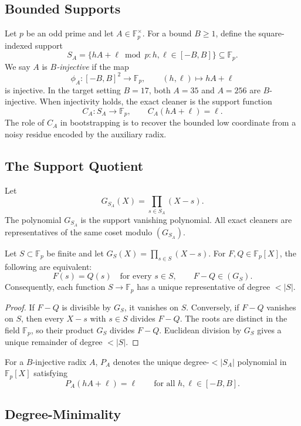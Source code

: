 \documentclass[a4paper,runningheads]{llncs}
\newcommand{\Fp}{\mathbb{F}_p}
\begin{document}
\subsection{Bounded Supports}

Let $p$ be an odd prime and let $A\in\Fp^\times$.  For a bound $B\ge 1$,
define the square-indexed support
\[
  S_A=\{hA+\ell \bmod p: h,\ell\in[-B,B]\}\subseteq\Fp .
\]
We say $A$ is \emph{$B$-injective} if the map
\[
  \phi_A:[-B,B]^2\to\Fp,\qquad (h,\ell)\mapsto hA+\ell
\]
is injective.  In the target setting $B=17$, both $A=35$ and $A=256$ are
$B$-injective.  When injectivity holds, the exact cleaner is the support
function
\[
  C_A:S_A\to\Fp,\qquad C_A(hA+\ell)=\ell.
\]
The role of $C_A$ in bootstrapping is to recover the bounded low coordinate
from a noisy residue encoded by the auxiliary radix.

\subsection{The Support Quotient}

Let
\[
  G_{S_A}(X)=\prod_{s\in S_A}(X-s).
\]
The polynomial $G_{S_A}$ is the support vanishing polynomial.  All exact
cleaners are representatives of the same coset modulo $(G_{S_A})$.

\begin{lemma}
\label{lem:support_quotient}
Let $S\subset\Fp$ be finite and let $G_S(X)=\prod_{s\in S}(X-s)$.  For
$F,Q\in\Fp[X]$, the following are equivalent:
\[
  F(s)=Q(s)\quad\text{for every }s\in S,
  \qquad
  F-Q\in(G_S).
\]
Consequently, each function $S\to\Fp$ has a unique representative of degree
$<|S|$.
\end{lemma}

\begin{proof}
If $F-Q$ is divisible by $G_S$, it vanishes on $S$.  Conversely, if $F-Q$
vanishes on $S$, then every $X-s$ with $s\in S$ divides $F-Q$.  The roots are
distinct in the field $\Fp$, so their product $G_S$ divides $F-Q$.  Euclidean
division by $G_S$ gives a unique remainder of degree $<|S|$.
\end{proof}

\begin{definition}
For a $B$-injective radix $A$, $P_A$ denotes the unique degree-$<|S_A|$
polynomial in $\Fp[X]$ satisfying
\[
  P_A(hA+\ell)=\ell\qquad\text{for all }h,\ell\in[-B,B].
\]
\end{definition}

\subsection{Degree-Minimality}
\end{document}
